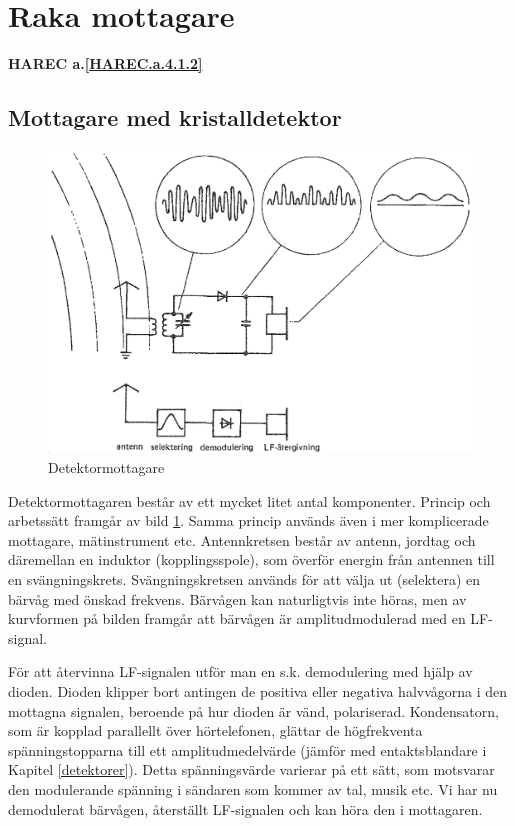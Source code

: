 \section{Raka mottagare}
\textbf{HAREC a.\ref{HAREC.a.4.1.2}\label{myHAREC.a.4.1.2}}

\subsection{Mottagare med kristalldetektor}

\begin{figure}
  \includegraphics[width=\textwidth]{images/cropped_pdfs/bild_2_4-01.pdf}
  \caption{Detektormottagare}
  \label{fig:bildII4-1}
\end{figure}

Detektormottagaren består av ett mycket litet antal komponenter.
Princip och arbetssätt framgår av bild \ref{fig:bildII4-1}.
Samma princip används även i mer komplicerade mottagare, mätinstrument etc.
Antennkretsen består av antenn, jordtag och däremellan en induktor
(kopplingsspole), som överför energin från antennen till en svängningskrets.
Svängningskretsen används för att välja ut (selektera)
en bärvåg med önskad frekvens.
Bärvågen kan naturligtvis inte höras, men av kurvformen på bilden framgår
att bärvågen är amplitudmodulerad med en LF-signal.

För att återvinna LF-signalen utför man en s.k. demodulering med hjälp
av dioden.
Dioden klipper bort antingen de positiva eller negativa halvvågorna i den
mottagna signalen, beroende på hur dioden är vänd, polariserad.
Kondensatorn, som är kopplad parallellt över hörtelefonen, glättar de
högfrekventa spänningstopparna till ett amplitudmedelvärde (jämför med
entaktsblandare i Kapitel \ref{detektorer}).
Detta spänningsvärde varierar på ett sätt, som motsvarar den modulerande
spänning i sändaren som kommer av tal, musik etc.
Vi har nu demodulerat bärvågen, återställt LF-signalen och kan höra den i
mottagaren.

